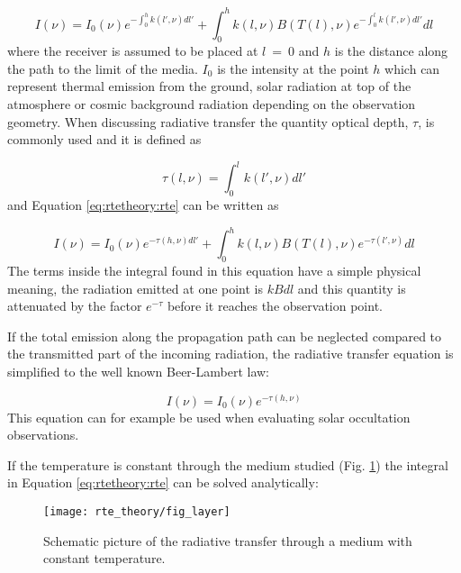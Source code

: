  \begin{equation}
   I(\nu) = I_0(\nu)e^{-\int^h_0{k(l',\nu)dl'}} + 
     \int^h_0{k(l,\nu)B(T(l),\nu) e^{-\int^l_0{k(l',\nu)dl'}} dl}
  \label{eq:rtetheory:rte}
 \end{equation}  
 where the receiver is assumed to be placed at $l$~=~0 and $h$ is the
 distance along the path to the limit of the media. $I_0$ is the
 intensity at the point $h$ which can represent thermal emission from
 the ground, solar radiation at top of the atmosphere or cosmic
 background radiation depending on the observation geometry. When
 discussing radiative transfer the quantity optical depth, $\tau$, is
 commonly used and it is defined as

 \begin{equation}
   \tau(l,\nu) = \int^l_0{k(l',\nu)dl'} 
  \label{eq:rtetheory:tau}
 \end{equation}  
 and Equation \ref{eq:rtetheory:rte} can be written as
 
 \begin{equation}
   I(\nu) = I_0(\nu)e^{-\tau(h,\nu)dl'} + 
     \int^h_0{k(l,\nu)B(T(l),\nu) e^{-\tau(l',\nu)} dl}
  \label{eq:rtetheory:rte2}
 \end{equation}  
 The terms inside the integral found in this equation have a simple
 physical meaning, the radiation emitted at one point is $kBdl$ and this
 quantity is attenuated by the factor $e^{-\tau}$ before it reaches the
 observation point.


 \label{sec:rtetheory:special}
 
 If the total emission along the propagation path can be neglected
 compared to the transmitted part of the incoming radiation, the
 radiative transfer equation is simplified to the well known Beer-Lambert law:
 
 \begin{equation}
   I(\nu) = I_0(\nu)e^{-\tau(h,\nu)}
  \label{eq:rtetheory:beer}
 \end{equation}  
 This equation can for example be used when evaluating solar
 occultation observations.  
 
 If the temperature is constant through the medium studied (Fig.
 \ref{fig:rtetheory:layer}) the integral in Equation \ref{eq:rtetheory:rte} can be solved
 analytically:

 \begin{figure}
  \begin{center}
   \begin{minipage}[c]{0.4\textwidth}
    \centering
    \caption{Schematic picture of the radiative transfer through a medium with
             constant temperature.}
    \label{fig:rtetheory:layer}
   \end{minipage}%
   \hspace{0.05\textwidth}%
   \begin{minipage}[c]{0.50\textwidth}
    \centering
    \texttt{[image: rte\_theory/fig\_layer]}
   \end{minipage}
  \end{center}
 \end{figure}   
  
